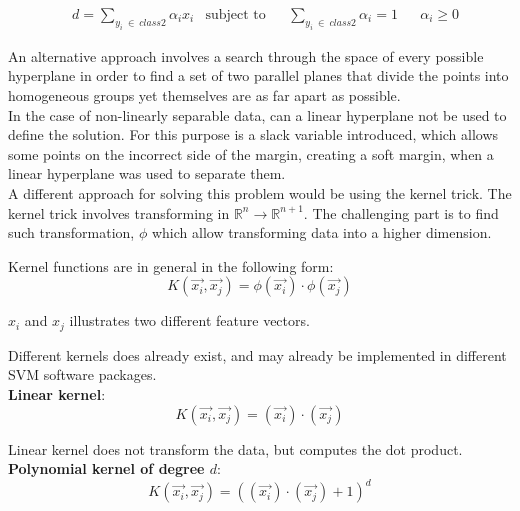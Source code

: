 \begin{equation}
\begin{aligned}
&d = \sum_{y_i~\in~class2} \alpha_ix_i  
& \text{subject to}
&& \sum_{y_i~\in~class2}\alpha_i =1 
&& \alpha_i \geq 0
\end{aligned} 
\end{equation}


An alternative approach involves a search through the space of every possible 
hyperplane in order to find a set of two parallel planes that divide the points 
into homogeneous groups yet themselves are as far apart as possible.\\


In the case of non-linearly separable data, can a linear hyperplane not be used 
to define the solution. 
For this purpose is a slack variable introduced, which allows some points on the 
incorrect side of the margin, creating a soft margin, when a linear hyperplane 
was used to separate them.\\

A different approach for solving this problem would be using the kernel trick. 
The kernel trick involves transforming in $\mathbb{R}^n \rightarrow 
\mathbb{R}^{n+1}$. 
The challenging part is to find such transformation, $\phi$ which allow 
transforming data into a higher dimension. 

Kernel functions are in general in the following form:
\begin{equation}
K(\overrightarrow{x_i},\overrightarrow{x_j}) = \phi(\overrightarrow{x_i}) \cdot 
\phi(\overrightarrow{x_j}) 
\end{equation}

$x_i$ and $x_j$ illustrates two different feature vectors. 

Different kernels does already exist, and may already be implemented in 
different SVM software packages. 
\\

\textbf{Linear kernel}:
\begin{equation}
K(\overrightarrow{x_i},\overrightarrow{x_j}) = (\overrightarrow{x_i}) \cdot 
(\overrightarrow{x_j}) 
\end{equation}

Linear kernel does not transform the data, but computes the dot product. 
\\

\textbf{Polynomial kernel of degree $d$}:
\begin{equation}
K(\overrightarrow{x_i},\overrightarrow{x_j}) = ((\overrightarrow{x_i}) \cdot 
(\overrightarrow{x_j})+1)^d
\end{equation}

